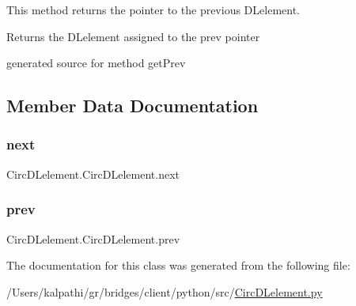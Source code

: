 This method returns the pointer to the previous D\+Lelement. 

\begin{DoxyReturn}{Returns}
the D\+Lelement assigned to the prev pointer\begin{DoxyVerb}generated source for method getPrev \end{DoxyVerb}
 
\end{DoxyReturn}


\subsection{Member Data Documentation}
\hypertarget{class_circ_d_lelement_1_1_circ_d_lelement_a58f067bcf3daa5c7a0e944bc91961af9}{}\label{class_circ_d_lelement_1_1_circ_d_lelement_a58f067bcf3daa5c7a0e944bc91961af9} 
\subsubsection{\texorpdfstring{next}{next}}
{\footnotesize\ttfamily Circ\+D\+Lelement.\+Circ\+D\+Lelement.\+next}

\hypertarget{class_circ_d_lelement_1_1_circ_d_lelement_a71d1419a7eb3687a3351e5ea0bcd55b4}{}\label{class_circ_d_lelement_1_1_circ_d_lelement_a71d1419a7eb3687a3351e5ea0bcd55b4} 
\subsubsection{\texorpdfstring{prev}{prev}}
{\footnotesize\ttfamily Circ\+D\+Lelement.\+Circ\+D\+Lelement.\+prev}



The documentation for this class was generated from the following file\+:\begin{DoxyCompactItemize}
\item 
/\+Users/kalpathi/gr/bridges/client/python/src/\hyperlink{_circ_d_lelement_8py}{Circ\+D\+Lelement.\+py}\end{DoxyCompactItemize}
